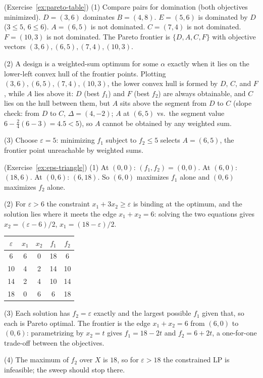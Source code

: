 \begin{solution}(Exercise~\ref{ex:pareto-table})
(1) Compare pairs for domination (both objectives minimized).  $D = (3,6)$ dominates $B = (4,8)$.  $E = (5,6)$ is dominated by $D$ ($3 \leq 5$, $6 \leq 6$).  $A = (6,5)$ is not dominated.  $C = (7,4)$ is not dominated.  $F = (10,3)$ is not dominated.  The Pareto frontier is $\{D, A, C, F\}$ with objective vectors $(3,6), (6,5), (7,4), (10,3)$.

(2) A design is a weighted-sum optimum for some $\alpha$ exactly when it lies on the lower-left convex hull of the frontier points.  Plotting $(3,6), (6,5), (7,4), (10,3)$, the lower convex hull is formed by $D$, $C$, and $F$, while $A$ lies above it: $D$ (best $f_1$) and $F$ (best $f_2$) are always obtainable, and $C$ lies on the hull between them, but $A$ sits above the segment from $D$ to $C$ (slope check: from $D$ to $C$, $\Delta = (4, -2)$; $A$ at $(6,5)$ vs.\ the segment value $6 - \tfrac{2}{4}(6-3) = 4.5 < 5$), so $A$ cannot be obtained by any weighted sum.

(3) Choose $\varepsilon = 5$: minimizing $f_1$ subject to $f_2 \leq 5$ selects $A = (6,5)$, the frontier point unreachable by weighted sums.
\end{solution}

\begin{solution}(Exercise~\ref{ex:eps-triangle})
(1) At $(0,0)$: $(f_1, f_2) = (0,0)$. At $(6,0)$: $(18, 6)$. At $(0,6)$: $(6, 18)$. So $(6,0)$ maximizes $f_1$ alone and $(0,6)$ maximizes $f_2$ alone.

(2) For $\varepsilon > 6$ the constraint $x_1 + 3x_2 \geq \varepsilon$ is binding at the optimum, and the solution lies where it meets the edge $x_1 + x_2 = 6$: solving the two equations gives $x_2 = (\varepsilon - 6)/2$, $x_1 = (18 - \varepsilon)/2$.
\begin{center}
\begin{tabular}{c|cccc}
$\varepsilon$ & $x_1$ & $x_2$ & $f_1$ & $f_2$ \\\hline
6  & 6 & 0 & 18 & 6 \\
10 & 4 & 2 & 14 & 10 \\
14 & 2 & 4 & 10 & 14 \\
18 & 0 & 6 & 6  & 18 \\
\end{tabular}
\par{}\label{tab:multi-objective-optimization_updated-tab05}%

\end{center}

(3) Each solution has $f_2 = \varepsilon$ exactly and the largest possible $f_1$ given that, so each is Pareto optimal. The frontier is the edge $x_1 + x_2 = 6$ from $(6,0)$ to $(0,6)$: parametrizing by $x_2 = t$ gives $f_1 = 18 - 2t$ and $f_2 = 6 + 2t$, a one-for-one trade-off between the objectives.

(4) The maximum of $f_2$ over $X$ is $18$, so for $\varepsilon > 18$ the constrained LP is infeasible; the sweep should stop there.
\end{solution}

